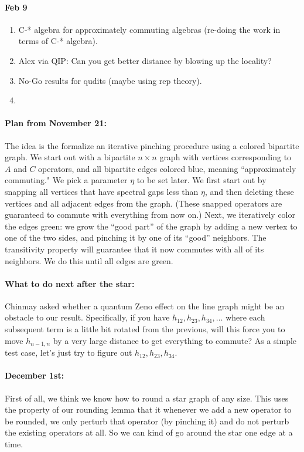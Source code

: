 \documentclass[11pt]{article}
\theoremstyle{plain}
\begin{document}
\paragraph{Feb 9}

\begin{enumerate}
    \item C-* algebra for approximately commuting algebras (re-doing the work in terms of C-* algebra).
    \item Alex via QIP: Can you get better distance by blowing up the locality?
    \item No-Go results for qudits (maybe using rep theory).
    \item 
\end{enumerate}

\paragraph{Plan from November 21:}
The idea is the formalize an iterative pinching procedure using a colored bipartite graph. We start out with a bipartite $n \times n$ graph with vertices corresponding to $A$ and $C$ operators, and all bipartite edges colored blue, meaning ``approximately commuting." We pick a parameter $\eta$ to be set later. We first start out by snapping all vertices that have spectral gaps less than $\eta$, and then deleting these vertices and all adjacent edges from the graph. (These snapped operators are guaranteed to commute with everything from now on.) Next, we iteratively color the edges green: we grow the ``good part'' of the graph by adding a new vertex to one of the two sides, and pinching it by one of its ``good'' neighbors. The transitivity property will guarantee that it now commutes with all of its neighbors. We do this until all edges are green.

\paragraph{What to do next after the star:} Chinmay asked whether a quantum Zeno effect on the line graph might be an obstacle to our result. Specifically, if you have $h_{12}, h_{23}, h_{34}, \dots$ where each subsequent term is a little bit rotated from the previous, will this force you to move $h_{n-1, n}$ by a very large distance to get everything to commute? As a simple test case, let's just try to figure out $h_{12}, h_{23}, h_{34}$. 

\paragraph{December 1st:} First of all, we think we know how to round a star graph of any size. This uses the property of our rounding lemma that it whenever we add a new operator to be rounded, we only perturb that operator (by pinching it) and do not perturb the existing operators at all. So we can kind of go around the star one edge at a time.
\end{document}
